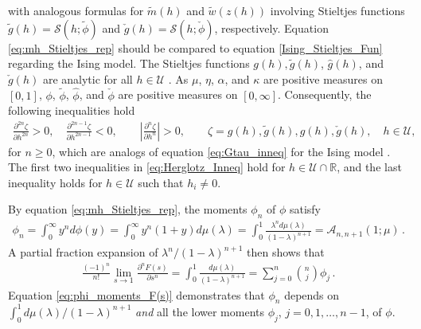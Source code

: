 \documentclass[english,12pt,jmp,graphicx]{revtex4-1}
\newcommand{\ph}{\hat{\phi}}
\begin{document}
%
with analogous formulas for $\tilde{m}(h)$ and $\tilde{w}(z(h))$
involving Stieltjes functions $\tilde{g}(h)=\mathcal{S}(h;\tilde{\phi})$
and $\check{g}(h)=\mathcal{S}(h;\check{\phi})$, respectively. Equation 
\eqref{eq:mh_Stieltjes_rep} should be compared to equation
\eqref{Ising_Stieltjes_Fun} regarding the Ising model. The Stieltjes 
functions $g(h),\tilde{g}(h)$, $\hat{g}(h)$, and $\check{g}(h)$ are
analytic for all $h\in\mathcal{U}$ \cite{Golden:CMP-473}.  As $\mu$, $\eta$,
$\alpha$, and $\kappa$ are positive measures on $[0,1]$, $\phi$, $\tilde{\phi}$,
$\ph$, and $\check{\phi}$ are positive measures on $[0,\infty]$. Consequently,
the following inequalities hold 
%
\begin{align}\label{eq:Herglotz_Inneq}
  \frac{\partial^{2n}\zeta}{\partial h^{2n}}>0, \quad
  \frac{\partial^{2n-1}\zeta}{\partial h^{2n-1}}<0, \qquad
  \left|\frac{\partial^n\zeta}{\partial h^n}\right|>0, \qquad
  \zeta=g(h),\tilde{g}(h),\hat{g}(h),\check{g}(h), \quad h\in\mathcal{U},
\end{align}
%
for $n\geq0$, which are analogs of equation \eqref{eq:Gtau_inneq} for the
Ising model \cite{Golden:JMP-5627}. The first two inequalities in
\eqref{eq:Herglotz_Inneq} hold for $h\in\mathcal{U}\cap\mathbb{R}$, and the
last inequality holds for $h\in\mathcal{U}$ such that $h_i\neq0$. 

By equation \eqref{eq:mh_Stieltjes_rep}, the moments $\phi_n$ of $\phi$
satisfy  
%
\begin{align}\label{eq:phi_moments}
  \phi_n=\int_0^\infty y^nd\phi(y)
    =\int_0^\infty y^n(1+y)d\mu(\lambda)
    =\int_0^1\frac{\lambda^nd\mu(\lambda)}{(1-\lambda)^{n+1}}=\mathcal{A}_{n,n+1}(1;\mu)\,.
\end{align}
%
A partial fraction expansion of $\lambda^n/(1-\lambda)^{n+1}$ then shows that
%
\begin{align}\label{eq:phi_moments_F(s)}
  \frac{(-1)^n}{n!}\lim_{s\to1}\frac{\partial^nF(s)}{\partial s^n}=\int_0^1\frac{d\mu(\lambda)}{(1-\lambda)^{n+1}}
                                =\sum_{j=0}^n{n \choose j} \phi_j\,.
\end{align}
%
Equation \eqref{eq:phi_moments_F(s)} demonstrates that $\phi_n$ depends
on $\int_0^1d\mu(\lambda)/(1-\lambda)^{n+1}$ \emph{and} all the lower moments $\phi_j$,
$j=0,1,\ldots,n-1$, of $\phi$.
\end{document}
